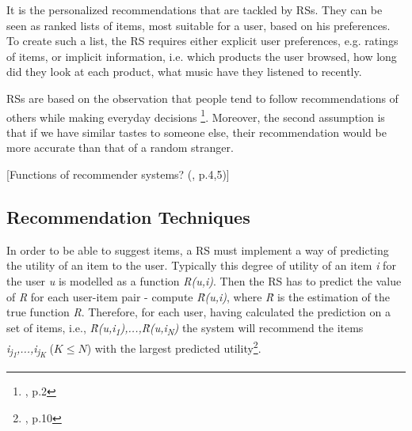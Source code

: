 \documentclass[12pt]{report}
\begin{document}
It is the personalized recommendations that are tackled by RSs. They can be seen as ranked lists of items, most suitable for a user, based on his preferences. To create such a list, the RS requires either explicit user preferences, e.g. ratings of items, or implicit information, i.e. which products the user browsed, how long did they look at each product, what music have they listened to recently.

RSs are based on the observation that people tend to follow recommendations of others while making everyday decisions \footnote{\cite{rec_sys_handbook}, p.2}. Moreover, the second assumption is that if we have similar tastes to someone else, their recommendation would be more accurate than that of a random stranger.

[Functions of recommender systems? (\cite{rec_sys_handbook}, p.4,5)]

\subsection{Recommendation Techniques}

In order to be able to suggest items, a RS must implement a way of predicting the utility of an item to the user. Typically this degree of utility of an item \textit{i} for the user \textit{u} is modelled as a function \textit{R(u,i)}. Then the RS has to predict the value of \textit{R} for each user-item pair - compute \textit{\^{R}(u,i)}, where \textit{\^{R}} is the estimation of the true function \textit{R}. Therefore, for each user, having calculated the prediction on a set of items, i.e., \textit{\^{R}(u,i\textsubscript{1}),...,\^{R}(u,i\textsubscript{N})} the system will recommend the items \textit{i\textsubscript{j\textsubscript{1}},...,i\textsubscript{j\textsubscript{K}}} ($K \leq N$) with the largest predicted utility\footnote{\cite{rec_sys_handbook}, p.10}.




\end{document}
